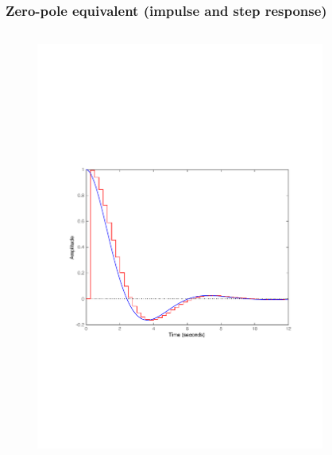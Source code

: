 \begin{frame}
	\frametitle{Zero-pole equivalent (impulse and step response)}
	\vspace{-0.7em}
	\begin{columns}
		\begin{column}{0.5\textwidth}
			\begin{figure}
				\centering
				\includegraphics[width=1\linewidth]{vb4I}
			\end{figure}
		\end{column}
		\begin{column}{0.5\textwidth}
			\begin{figure}
				\centering

\end{figure}
\end{column}
\end{columns}
\end{frame}
